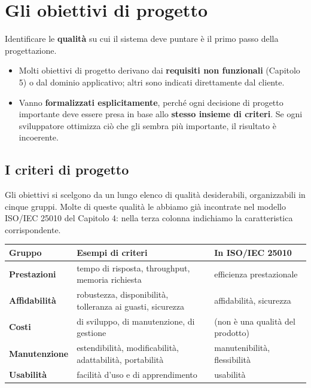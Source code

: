 \section{Gli obiettivi di progetto}

Identificare le \textbf{qualità} su cui il sistema deve puntare è il primo passo della progettazione.
\begin{itemize}
  \item Molti obiettivi di progetto derivano dai \textbf{requisiti non funzionali} (Capitolo 5) o dal dominio applicativo;
        altri sono indicati direttamente dal cliente.
  \item Vanno \textbf{formalizzati esplicitamente}, perché ogni decisione di progetto importante deve essere presa in base
        allo \textbf{stesso insieme di criteri}. Se ogni sviluppatore ottimizza ciò che gli sembra più importante, il
        risultato è incoerente.
\end{itemize}

\subsection{I criteri di progetto}

Gli obiettivi si scelgono da un lungo elenco di qualità desiderabili, organizzabili in cinque gruppi. Molte di queste
qualità le abbiamo già incontrate nel modello ISO/IEC 25010 del Capitolo 4: nella terza colonna indichiamo la
caratteristica corrispondente.

\begin{center}
\renewcommand{\arraystretch}{1.35}
\begin{tabular}{@{}>{\bfseries}l p{6.3cm} p{4.6cm}@{}}
  \toprule
  \normalfont\textbf{Gruppo} & \textbf{Esempi di criteri} & \textbf{In ISO/IEC 25010} \\
  \midrule
  \color{q1}Prestazioni   & tempo di risposta, throughput, memoria richiesta & efficienza prestazionale \\
  \color{q6}Affidabilità  & robustezza, disponibilità, tolleranza ai guasti, sicurezza & affidabilità, sicurezza \\
  \color{q5}Costi         & di sviluppo, di manutenzione, di gestione & (non è una qualità del prodotto) \\
  \color{q2}Manutenzione  & estendibilità, modificabilità, adattabilità, portabilità & manutenibilità, flessibilità \\
  \color{q8}Usabilità     & facilità d'uso e di apprendimento & usabilità \\
  \bottomrule
\end{tabular}
\end{center}

